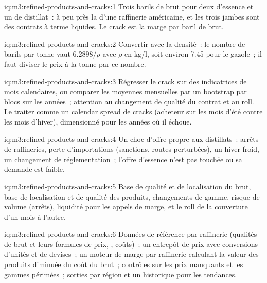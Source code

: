 \begin{solution}{iq:m3:refined-products-and-cracks:1}
Trois barils de brut pour deux d'essence et un de distillat~: à peu près la  d'une
raffinerie américaine, et les trois jambes sont des contrats à terme liquides. Le crack est la marge par baril de
brut.
\end{solution}

\begin{solution}{iq:m3:refined-products-and-cracks:2}
Convertir avec la densité~: le nombre de barils par tonne vaut $6.2898/\rho$ avec $\rho$ en kg/l, soit environ 7.45
pour le gazole~; il faut diviser le prix à la tonne par ce nombre.
\end{solution}

\begin{solution}{iq:m3:refined-products-and-cracks:3}
Régresser le crack sur des indicatrices de mois calendaires, ou comparer les moyennes mensuelles par un bootstrap par blocs
sur les années~; attention au changement de qualité du contrat et au roll. Le traiter comme un
calendar spread de cracks (acheteur sur les mois d'été contre les mois d'hiver), dimensionné pour les années où il
échoue.
\end{solution}

\begin{solution}{iq:m3:refined-products-and-cracks:4}
Un choc d'offre propre aux distillats~: arrêts de raffineries, perte d'importations (sanctions,
routes perturbées), un hiver froid, un changement de réglementation~; l'offre d'essence n'est pas touchée ou
sa demande est faible.
\end{solution}

\begin{solution}{iq:m3:refined-products-and-cracks:5}
Base de qualité et de localisation du brut, base de localisation et de qualité des produits, changements de gamme,
risque de volume (arrêts), liquidité pour les appels de marge, et le roll de la couverture d'un mois à l'autre.
\end{solution}

\begin{solution}{iq:m3:refined-products-and-cracks:6}
Données de référence par raffinerie (qualités de brut et leurs formules de prix, , coûts)~; un
entrepôt de prix avec conversions d'unités et de devises~; un moteur de marge par raffinerie calculant
la valeur des produits diminuée du coût du brut~; contrôles sur les prix manquants et les gammes périmées~; sorties par
région et un historique pour les tendances.
\end{solution}
